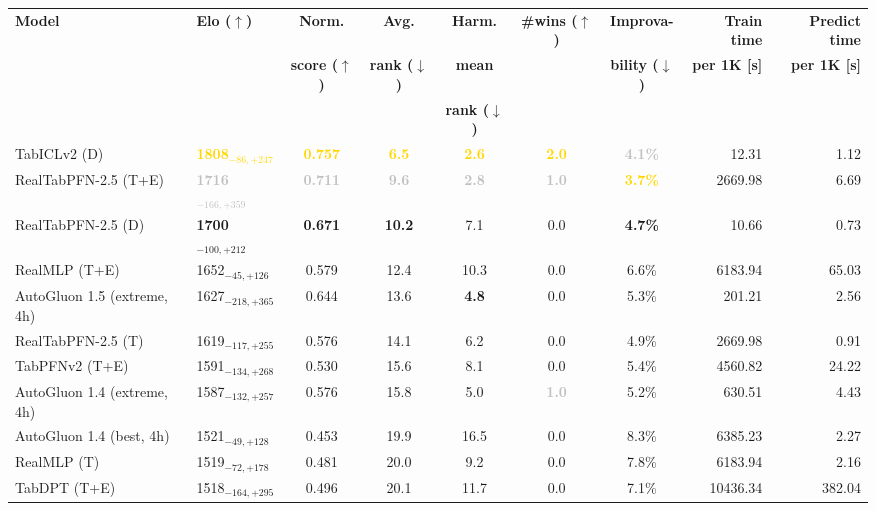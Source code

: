 \begin{tabular}{llcccccrr}
\toprule
\textbf{Model} & \textbf{Elo ($\uparrow$)} & \textbf{Norm.} & \textbf{Avg.} & \textbf{Harm.} & \textbf{\#wins ($\uparrow$)} & \textbf{Improva-} & \textbf{Train time} & \textbf{Predict time} \\
 &  & \textbf{score ($\uparrow$)} & \textbf{rank ($\downarrow$)} & \textbf{mean} &  & \textbf{bility ($\downarrow$)} & \textbf{per 1K [s]} & \textbf{per 1K [s]} \\
 &  &  &  & \textbf{rank ($\downarrow$)} &  &  &  &  \\
\midrule
TabICLv2 (D) & \textcolor{gold}{\textbf{1808${}_{-86,+247}$}} & \textcolor{gold}{\textbf{0.757}} & \textcolor{gold}{\textbf{6.5}} & \textcolor{gold}{\textbf{2.6}} & \textcolor{gold}{\textbf{2.0}} & \textcolor{silver}{\textbf{4.1\%}} & 12.31 & 1.12 \\
RealTabPFN-2.5 (T+E) & \textcolor{silver}{\textbf{1716${}_{-166,+359}$}} & \textcolor{silver}{\textbf{0.711}} & \textcolor{silver}{\textbf{9.6}} & \textcolor{silver}{\textbf{2.8}} & \textcolor{silver}{\textbf{1.0}} & \textcolor{gold}{\textbf{3.7\%}} & 2669.98 & 6.69 \\
RealTabPFN-2.5 (D) & \textcolor{bronze}{\textbf{1700${}_{-100,+212}$}} & \textcolor{bronze}{\textbf{0.671}} & \textcolor{bronze}{\textbf{10.2}} & 7.1 & 0.0 & \textcolor{bronze}{\textbf{4.7\%}} & 10.66 & 0.73 \\
RealMLP (T+E) & 1652${}_{-45,+126}$ & 0.579 & 12.4 & 10.3 & 0.0 & 6.6\% & 6183.94 & 65.03 \\
AutoGluon 1.5 (extreme, 4h) & 1627${}_{-218,+365}$ & 0.644 & 13.6 & \textcolor{bronze}{\textbf{4.8}} & 0.0 & 5.3\% & 201.21 & 2.56 \\
RealTabPFN-2.5 (T) & 1619${}_{-117,+255}$ & 0.576 & 14.1 & 6.2 & 0.0 & 4.9\% & 2669.98 & 0.91 \\
TabPFNv2 (T+E) & 1591${}_{-134,+268}$ & 0.530 & 15.6 & 8.1 & 0.0 & 5.4\% & 4560.82 & 24.22 \\
AutoGluon 1.4 (extreme, 4h) & 1587${}_{-132,+257}$ & 0.576 & 15.8 & 5.0 & \textcolor{silver}{\textbf{1.0}} & 5.2\% & 630.51 & 4.43 \\
AutoGluon 1.4 (best, 4h) & 1521${}_{-49,+128}$ & 0.453 & 19.9 & 16.5 & 0.0 & 8.3\% & 6385.23 & 2.27 \\
RealMLP (T) & 1519${}_{-72,+178}$ & 0.481 & 20.0 & 9.2 & 0.0 & 7.8\% & 6183.94 & 2.16 \\
TabDPT (T+E) & 1518${}_{-164,+295}$ & 0.496 & 20.1 & 11.7 & 0.0 & 7.1\% & 10436.34 & 382.04 \\

\end{tabular}
